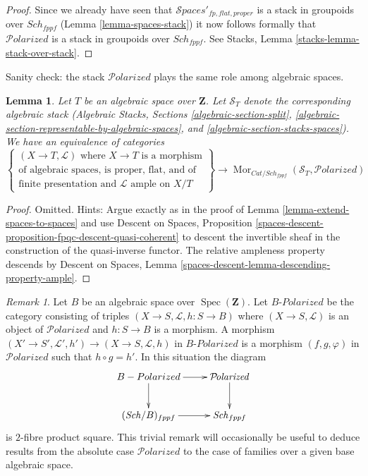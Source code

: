 \documentclass{stacks-project}
\theoremstyle{plain}
\newtheorem{lemma}[subsection]{Lemma}
\theoremstyle{definition}
\theoremstyle{remark}
\newtheorem{remark}[subsection]{Remark}
\numberwithin{equation}{subsection}
\def\Spec{\mathop{\mathrm{Spec}}}
\def\Sch{\mathit{Sch}}
\def\Mor{\mathop{\mathrm{Mor}}\nolimits}
\def\Spacesstack{\mathcal{S}\!\mathit{paces}}
\def\Polarizedstack{\mathcal{P}\!\mathit{olarized}}
\begin{document}
\begin{proof}
\medskip\noindent
Since we already have seen that $\Spacesstack'_{fp, flat, proper}$
is a stack in groupoids over $\Sch_{fppf}$
(Lemma \ref{lemma-spaces-stack}) it now follows formally
that $\Polarizedstack$ is a stack in groupoids over $\Sch_{fppf}$.
See Stacks, Lemma \ref{stacks-lemma-stack-over-stack}.
\end{proof}

\noindent
Sanity check: the stack $\Polarizedstack$ plays
the same role among algebraic spaces.

\begin{lemma}
\label{lemma-extend-polarized-to-spaces}
Let $T$ be an algebraic space over $\mathbf{Z}$. Let $\mathcal{S}_T$
denote the corresponding algebraic stack (Algebraic Stacks, Sections
\ref{algebraic-section-split},
\ref{algebraic-section-representable-by-algebraic-spaces}, and
\ref{algebraic-section-stacks-spaces}).
We have an equivalence of categories
$$
\left\{
\begin{matrix}
(X \to T, \mathcal{L})\text{ where }X \to T\text{ is a morphism}\\
\text{of algebraic spaces, is proper, flat, and of}\\
\text{finite presentation and }\mathcal{L}\text{ ample on }X/T
\end{matrix}
\right\}
\longrightarrow
\Mor_{\textit{Cat}/\Sch_{fppf}}(\mathcal{S}_T, \Polarizedstack)
$$
\end{lemma}

\begin{proof}
Omitted. Hints: Argue exactly as in the proof of
Lemma \ref{lemma-extend-spaces-to-spaces} and use
Descent on Spaces, Proposition
\ref{spaces-descent-proposition-fpqc-descent-quasi-coherent}
to descent the invertible sheaf in the construction
of the quasi-inverse functor. The relative ampleness property descends
by Descent on Spaces, Lemma
\ref{spaces-descent-lemma-descending-property-ample}.
\end{proof}

\begin{remark}
\label{remark-polarized-base-change}
Let $B$ be an algebraic space over $\Spec(\mathbf{Z})$.
Let $B\textit{-Polarized}$ be the category consisting
of triples $(X \to S, \mathcal{L}, h : S \to B)$
where $(X \to S, \mathcal{L})$ is an object of
$\Polarizedstack$ and $h : S \to B$ is a morphism.
A morphism $(X' \to S', \mathcal{L}', h') \to (X \to S, \mathcal{L}, h)$
in $B\textit{-Polarized}$ is a morphism $(f, g, \varphi)$
in $\Polarizedstack$ such that $h \circ g = h'$.
In this situation the diagram
$$
\xymatrix{
B\textit{-Polarized} \ar[r] \ar[d] & \Polarizedstack \ar[d] \\
(\Sch/B)_{fppf} \ar[r] & \Sch_{fppf}
}
$$
is $2$-fibre product square. This trivial remark
will occasionally be useful to deduce results from
the absolute case $\Polarizedstack$ to the case
of families over a given base algebraic space.
\end{remark}
\end{document}
